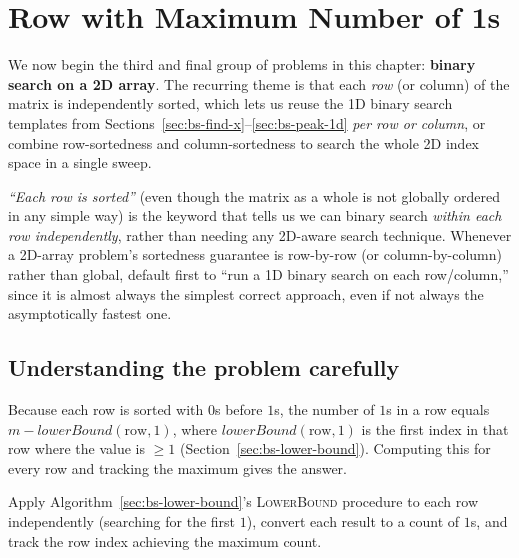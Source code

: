\section{Row with Maximum Number of 1s}
\label{sec:bs-row-max-ones}

\noindent We now begin the third and final group of problems in this
chapter: \textbf{binary search on a 2D array}. The recurring theme is that
each \emph{row} (or column) of the matrix is independently sorted, which
lets us reuse the 1D binary search templates from
Sections~\ref{sec:bs-find-x}--\ref{sec:bs-peak-1d} \emph{per row or
column}, or combine row-sortedness and column-sortedness to search the
whole 2D index space in a single sweep.


\begin{patternbox}
\emph{``Each row is sorted''} (even though the matrix as a whole is not
globally ordered in any simple way) is the keyword that tells us we can
binary search \emph{within each row independently}, rather than needing
any 2D-aware search technique. Whenever a 2D-array problem's sortedness
guarantee is row-by-row (or column-by-column) rather than global,
default first to ``run a 1D binary search on each row/column,'' since it
is almost always the simplest correct approach, even if not always the
asymptotically fastest one.
\end{patternbox}

\subsection*{Understanding the problem carefully}

Because each row is sorted with $0$s before $1$s, the number of $1$s in a
row equals $m - \textit{lowerBound}(\text{row}, 1)$, where
$\textit{lowerBound}(\text{row}, 1)$ is the first index in that row where
the value is $\ge 1$ (Section~\ref{sec:bs-lower-bound}). Computing this for
every row and tracking the maximum gives the answer.

\begin{ideabox}
Apply Algorithm~\ref{sec:bs-lower-bound}'s \textsc{LowerBound} procedure
to each row independently (searching for the first $1$), convert each
result to a count of $1$s, and track the row index achieving the maximum
count.
\end{ideabox}

